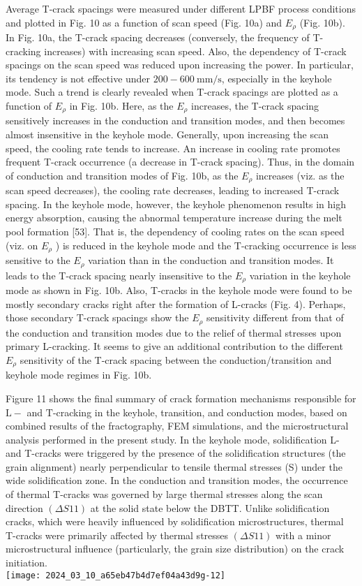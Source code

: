 \documentclass[10pt]{article}
\begin{document}
Average T-crack spacings were measured under different LPBF process conditions and plotted in Fig. 10 as a function of scan speed (Fig. 10a) and $E_{\rho}$ (Fig. 10b). In Fig. 10a, the T-crack spacing decreases (conversely, the frequency of T-cracking increases) with increasing scan speed. Also, the dependency of T-crack spacings on the scan speed was reduced upon increasing the power. In particular, its tendency is not effective under $200-600 \mathrm{~mm} / \mathrm{s}$, especially in the keyhole mode. Such a trend is clearly revealed when T-crack spacings are plotted as a function of $E_{\rho}$ in Fig. 10b. Here, as the $E_{\rho}$ increases, the T-crack spacing sensitively increases in the conduction and transition modes, and then becomes almost insensitive in the keyhole mode. Generally, upon increasing the scan speed, the cooling rate tends to increase. An increase in cooling rate promotes frequent T-crack occurrence (a decrease in T-crack spacing). Thus, in the domain of conduction and transition modes of Fig. 10b, as the $E_{\rho}$ increases (viz. as the scan speed decreases), the cooling rate decreases, leading to increased T-crack spacing. In the keyhole mode, however, the keyhole phenomenon results in high energy absorption, causing the abnormal temperature increase during the melt pool formation [53]. That is, the dependency of cooling rates on the scan speed (viz. on $E_{\rho}$ ) is reduced in the keyhole mode and the T-cracking occurrence is less sensitive to the $E_{\rho}$ variation than in the conduction and transition modes. It leads to the T-crack spacing nearly insensitive to the $E_{\rho}$ variation in the keyhole mode as shown in Fig. 10b. Also, T-cracks in the keyhole mode were found to be mostly secondary cracks right after the formation of L-cracks (Fig. 4). Perhaps, those secondary T-crack spacings show the $E_{\rho}$ sensitivity different from that of the conduction and transition modes due to the relief of thermal stresses upon primary L-cracking. It seems to give an additional contribution to the different $E_{\rho}$ sensitivity of the T-crack spacing between the conduction/transition and keyhole mode regimes in Fig. 10b.

Figure 11 shows the final summary of crack formation mechanisms responsible for $\mathrm{L}-$ and $\mathrm{T}$-cracking in the keyhole, transition, and conduction modes, based on combined results of the fractography, FEM simulations, and the microstructural analysis performed in the present study. In the keyhole mode, solidification L- and T-cracks were triggered by the presence of the solidification structures (the grain alignment) nearly perpendicular to tensile thermal stresses (S) under the wide solidification zone. In the conduction and transition modes, the occurrence of thermal T-cracks was governed by large thermal stresses along the scan direction $(\Delta S 11)$ at the solid state below the DBTT. Unlike solidification cracks, which were heavily influenced by solidification microstructures, thermal T-cracks were primarily affected by thermal stresses $(\Delta S 11)$ with a minor microstructural influence (particularly, the grain size distribution) on the crack initiation.\\
\texttt{[image: 2024\_03\_10\_a65eb47b4d7ef04a43d9g-12]}
\end{document}
